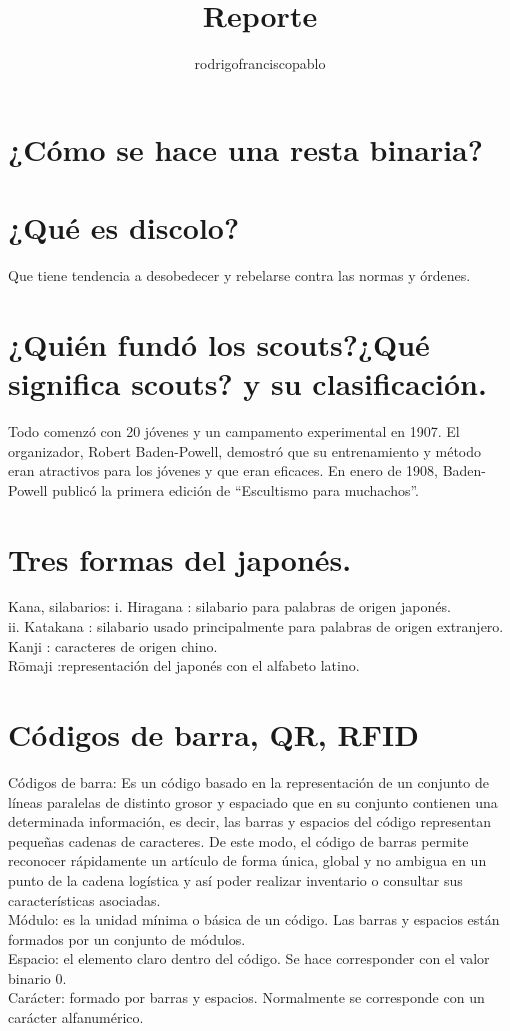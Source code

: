 \documentclass{mylib/reporte}
\title{Reporte}
\author{rodrigofranciscopablo }
\begin{document}
\coverPage

\tableofcontents

\section{¿Cómo se hace una resta binaria?}
\section{¿Qué es discolo?}
Que tiene tendencia a desobedecer y rebelarse contra las normas y órdenes.
\section{¿Quién fundó los scouts?¿Qué significa scouts? y su clasificación.}
Todo comenzó con 20 jóvenes y un campamento experimental en 1907. El organizador, Robert Baden-Powell, demostró que su entrenamiento y método eran atractivos para los jóvenes y que eran eficaces.
En enero de 1908, Baden-Powell publicó la primera edición de “Escultismo para muchachos”.


\section{Tres formas del japonés.}

Kana, silabarios:
i. Hiragana : silabario para palabras de origen japonés.\\
ii. Katakana : silabario usado principalmente para palabras de origen extranjero.\\
Kanji : caracteres de origen chino.\\
Rōmaji :representación del japonés con el alfabeto latino.\\

\section{Códigos de barra, QR, RFID}

Códigos de barra: Es un código basado en la representación de un conjunto de líneas paralelas de distinto grosor y espaciado que en su conjunto contienen una determinada información, es decir, las barras y espacios del código representan pequeñas cadenas de caracteres. De este modo, el código de barras permite reconocer rápidamente un artículo de forma única, global y no ambigua en un punto de la cadena logística y así poder realizar inventario o consultar sus características asociadas. \\
Módulo: es la unidad mínima o básica de un código. Las barras y espacios están formados por un conjunto de módulos.\\
Espacio: el elemento claro dentro del código. Se hace corresponder con el valor binario 0.\\
Carácter: formado por barras y espacios. Normalmente se corresponde con un carácter alfanumérico.
\end{document}

